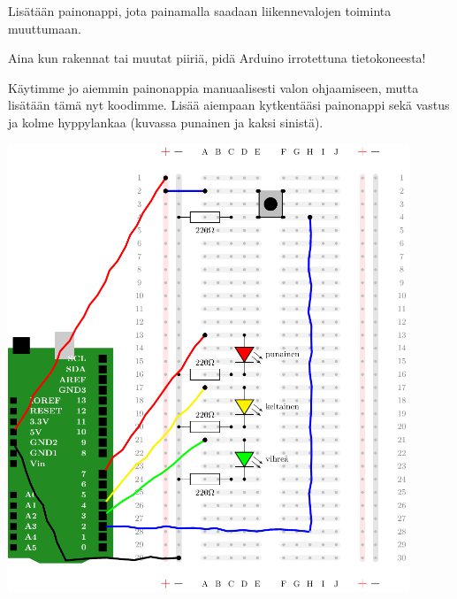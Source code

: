 \begin{tcolorbox}[colback=blue!10,title=Piirin toiminta,colbacktitle=purple!90]
Lisätään painonappi, jota painamalla saadaan liikennevalojen toiminta muuttumaan.
\end{tcolorbox}

\begin{tcolorbox}[colback=red!10,colbacktitle=red,title=HUOM!]
Aina kun rakennat tai muutat piiriä, pidä Arduino irrotettuna tietokoneesta! 
\end{tcolorbox}

Käytimme jo aiemmin painonappia manuaalisesti valon ohjaamiseen, mutta lisätään tämä nyt koodimme. Lisää aiempaan kytkentääsi painonappi sekä vastus ja kolme hyppylankaa (kuvassa punainen ja kaksi sinistä).

\includegraphics[width=0.9\textwidth]{kuvat/kuva10.pdf}



